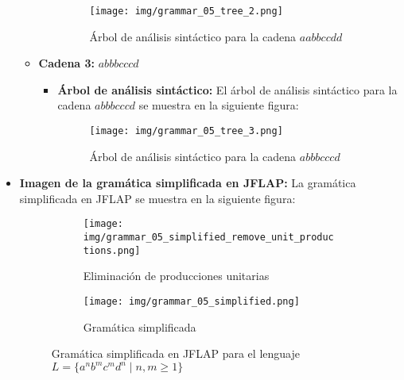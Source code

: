 \documentclass[11pt]{report}
\begin{document}
\begin{itemize}
\begin{itemize}
\begin{itemize}
      \begin{figure}[H]
        \centering
        \texttt{[image: img/grammar\_05\_tree\_2.png]}
        \caption{Árbol de análisis sintáctico para la cadena $aabbccdd$}
        \label{fig:arbol14}
      \end{figure}
    \end{itemize}
    \item \textbf{Cadena 3:} $abbbcccd$
    \begin{itemize}
      \item \textbf{Árbol de análisis sintáctico:} El árbol de análisis sintáctico para la cadena $abbbcccd$ se muestra en la siguiente figura:
      \begin{figure}[H]
        \centering
        \texttt{[image: img/grammar\_05\_tree\_3.png]}
        \caption{Árbol de análisis sintáctico para la cadena $abbbcccd$}
        \label{fig:arbol15}
      \end{figure}
    \end{itemize}
  \end{itemize}
  \item \textbf{Imagen de la gramática simplificada en JFLAP:} La gramática simplificada en JFLAP se muestra en la siguiente figura:
  \begin{figure}[H]
    \begin{subfigure}{0.5\textwidth}
      \centering
      \texttt{[image: img/grammar\_05\_simplified\_remove\_unit\_productions.png]}
      \caption{Eliminación de producciones unitarias}
    \end{subfigure}%
    \begin{subfigure}{0.5\textwidth}
      \centering
      \texttt{[image: img/grammar\_05\_simplified.png]}
      \caption{Gramática simplificada}
    \end{subfigure}
    \caption{Gramática simplificada en JFLAP para el lenguaje $L = \{a^n b^m c^m d^n \mid n, m \geq 1\}$}
  \end{figure}
\end{itemize}

\newpage

\end{document}
